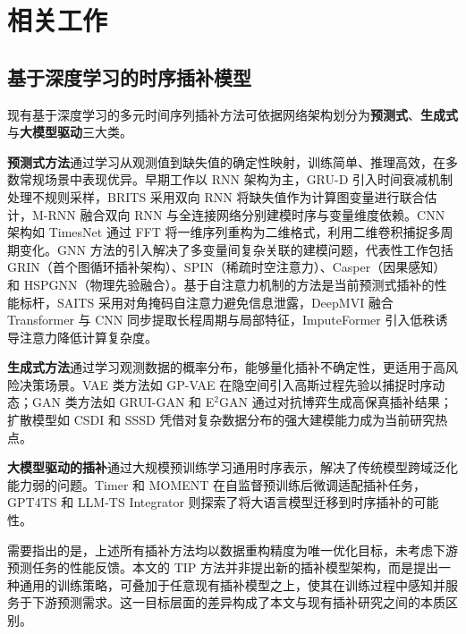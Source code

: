 \documentclass{article}
\begin{document}
\section{相关工作}

\subsection{基于深度学习的时序插补模型}

现有基于深度学习的多元时间序列插补方法可依据网络架构划分为\textbf{预测式}、\textbf{生成式}与\textbf{大模型驱动}三大类。

\textbf{预测式方法}通过学习从观测值到缺失值的确定性映射，训练简单、推理高效，在多数常规场景中表现优异。早期工作以 RNN 架构为主，GRU-D\citep{che2018} 引入时间衰减机制处理不规则采样，BRITS\citep{NEURIPS2018_734e6bfc} 采用双向 RNN 将缺失值作为计算图变量进行联合估计，M-RNN\citep{yoon2018estimating} 融合双向 RNN 与全连接网络分别建模时序与变量维度依赖。CNN 架构如 TimesNet\citep{wu2023timesnet} 通过 FFT 将一维序列重构为二维格式，利用二维卷积捕捉多周期变化。GNN 方法的引入解决了多变量间复杂关联的建模问题，代表性工作包括 GRIN\citep{Cini2021FillingTG}（首个图循环插补架构）、SPIN\citep{marisca2022learning}（稀疏时空注意力）、Casper\citep{10.1145/3627673.3679642}（因果感知）和 HSPGNN\citep{liang2024higher}（物理先验融合）。基于自注意力机制的方法是当前预测式插补的性能标杆，SAITS\citep{du2023saits} 采用对角掩码自注意力避免信息泄露，DeepMVI\citep{ZHANG202167} 融合 Transformer 与 CNN 同步提取长程周期与局部特征，ImputeFormer\citep{10.1145/3637528.3671751} 引入低秩诱导注意力降低计算复杂度。

\textbf{生成式方法}通过学习观测数据的概率分布，能够量化插补不确定性，更适用于高风险决策场景。VAE 类方法如 GP-VAE\citep{pmlr-v108-fortuin20a} 在隐空间引入高斯过程先验以捕捉时序动态；GAN 类方法如 GRUI-GAN\citep{luo2018multivariate} 和 E$^2$GAN\citep{10.5555/3367243.3367469} 通过对抗博弈生成高保真插补结果；扩散模型如 CSDI\citep{tashiro2021csdi} 和 SSSD\citep{alcaraz2023diffusionbased} 凭借对复杂数据分布的强大建模能力成为当前研究热点。

\textbf{大模型驱动的插补}通过大规模预训练学习通用时序表示，解决了传统模型跨域泛化能力弱的问题。Timer\citep{liu2024timer} 和 MOMENT\citep{pmlr-v235-goswami24a} 在自监督预训练后微调适配插补任务，GPT4TS\citep{NEURIPS2023_86c17de0} 和 LLM-TS Integrator\citep{chen2024enhance} 则探索了将大语言模型迁移到时序插补的可能性。

需要指出的是，上述所有插补方法均以数据重构精度为唯一优化目标，未考虑下游预测任务的性能反馈。本文的 TIP 方法并非提出新的插补模型架构，而是提出一种通用的训练策略，可叠加于任意现有插补模型之上，使其在训练过程中感知并服务于下游预测需求。这一目标层面的差异构成了本文与现有插补研究之间的本质区别。
\end{document}
